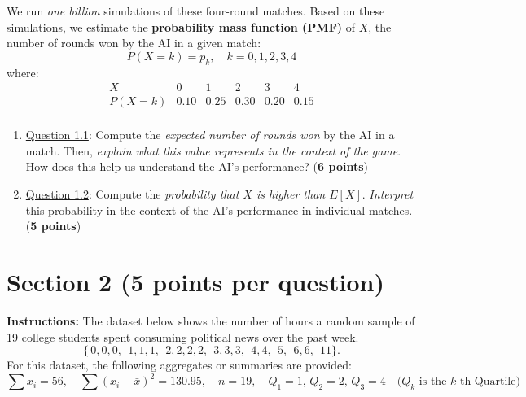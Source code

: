 \documentclass{article}
\newcommand{\blankbox}[2][3cm]{%
    \vspace{-0.5em}
    \begin{figure}[H]
        \makebox[\linewidth]{%
            \begin{tcolorbox}[
                colback=white,
                colframe=black,
                width=#2, %
                height=#1,
                boxrule=0.2mm
            ]
            \end{tcolorbox}
        }
    \end{figure}
    \vspace{-2em}
}
\begin{document}
We run \emph{one billion} simulations of these four-round matches. Based on these simulations, we estimate the \textbf{probability mass function (PMF)} of $X$, the number of rounds won by the AI in a given match:
\[
P(X = k) = p_k, \quad k = 0,1,2,3,4
\]
where:
\[
\begin{array}{c|c|c|c|c|c}
X & 0 & 1 & 2 & 3 & 4 \\\hline
P(X = k) & 0.10 & 0.25 & 0.30 & 0.20 & 0.15 \\
\end{array}
\]

\begin{enumerate}
    \item \underline{Question 1.1}: Compute the \emph{expected number of rounds won} by the AI in a match. Then, \emph{explain what this value represents in the context of the game}. How does this help us understand the AI's performance?  (\textbf{6 points})
        \blankbox[6cm]{1.06\textwidth}
    \item \underline{Question 1.2}: Compute the \emph{probability that $X$ is higher than $E[X]$}. \emph{Interpret} this probability in the context of the AI's performance in individual matches. (\textbf{5 points})
        \blankbox[5cm]{1.06\textwidth}


\end{enumerate}

\newpage
\section*{Section 2 (5 points per question)}

\noindent\textbf{Instructions:}
The dataset below shows the number of hours a random sample of 19 college students spent consuming political news over the past week.
\[
\{\,0,0,0,\;\,1,1,1,\;\,2,2,2,2,\;\,3,3,3,\;\,4,4,\;\,5,\;\,6,6,\;\,11\}.
\]
\noindent
For this dataset, the following aggregates or summaries are provided:
\[
\sum x_i = 56, \quad \sum (x_i - \bar{x})^2 = 130.95, \quad n = 19,  \quad  Q_1 = 1,\, Q_2 = 2, \, Q_3 = 4 \quad \text{($Q_k$ is the $k$-th Quartile)}
\]

\begin{comment}
{
    "sum_x": 56,
    "sum_x_squared": 296,
    "sum_x_minus_mean_squared": 130.95,  # Rounded from 130.9473684210526
    "n": 19,
    "Q1": 1.0,
    "Q2": 2.0,
    "Q3": 4.0
}
\end{comment}
\end{document}
